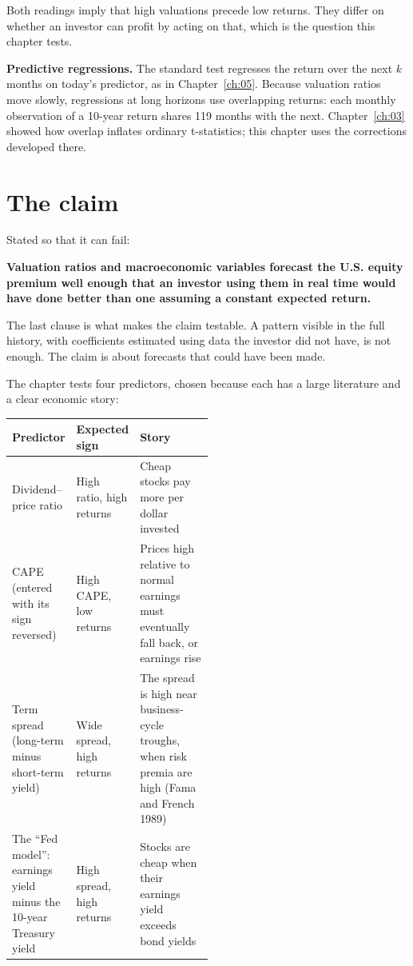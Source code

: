 Both readings imply that high valuations precede low returns. They differ on whether an investor can profit by acting on that, which is the question this chapter tests.

\textbf{Predictive regressions.} The standard test regresses the return over the next $k$ months on today's predictor, as in Chapter~\ref{ch:05}. Because valuation ratios move slowly, regressions at long horizons use overlapping returns: each monthly observation of a 10-year return shares 119 months with the next. Chapter~\ref{ch:03} showed how overlap inflates ordinary t-statistics; this chapter uses the corrections developed there.

\section{The claim}
\label{sec:07-claim}

Stated so that it can fail:

\begin{callout}
\textbf{Valuation ratios and macroeconomic variables forecast the U.S. equity premium well enough that an investor using them in real time would have done better than one assuming a constant expected return.}
\end{callout}

The last clause is what makes the claim testable. A pattern visible in the full history, with coefficients estimated using data the investor did not have, is not enough. The claim is about forecasts that could have been made.

The chapter tests four predictors, chosen because each has a large literature and a clear economic story:

\begin{center}
\small
\begin{tabularx}{0.9\linewidth}{@{}>{\raggedright\arraybackslash}p{0.30\linewidth}>{\raggedright\arraybackslash}p{0.20\linewidth}>{\raggedright\arraybackslash}X@{}}
\toprule
Predictor & Expected sign & Story \\
\midrule
Dividend--price ratio & High ratio, high returns & Cheap stocks pay more per dollar invested \\
CAPE (entered with its sign reversed) & High CAPE, low returns & Prices high relative to normal earnings must eventually fall back, or earnings rise \\
Term spread (long-term minus short-term yield) & Wide spread, high returns & The spread is high near business-cycle troughs, when risk premia are high (Fama and French 1989) \\
The ``Fed model'': earnings yield minus the 10-year Treasury yield & High spread, high returns & Stocks are cheap when their earnings yield exceeds bond yields \\
\bottomrule
\end{tabularx}
\end{center}

